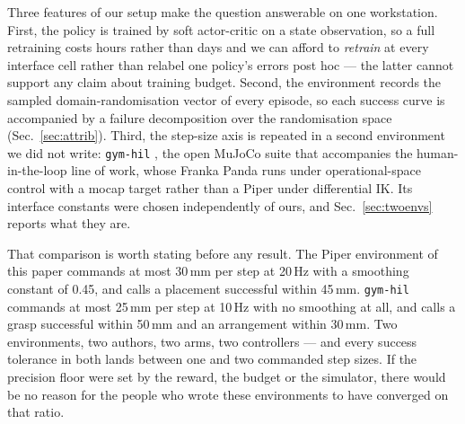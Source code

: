 \documentclass{article}
\begin{document}
Three features of our setup make the question answerable on one workstation.
First, the policy is trained by soft actor-critic \citep{haarnoja2018sac} on a
state observation, so a full retraining costs hours rather than days and we can
afford to \emph{retrain} at every interface cell rather than relabel one
policy's errors post hoc --- the latter cannot support any claim about training
budget. Second, the environment records the sampled domain-randomisation vector
of every episode, so each success curve is accompanied by a failure
decomposition over the randomisation space (Sec.~\ref{sec:attrib}). Third, the
step-size axis is repeated in a second environment we did not write:
\texttt{gym-hil} \citep{gymhil2025}, the open MuJoCo suite that accompanies the
human-in-the-loop line of work, whose Franka Panda runs under operational-space
control with a mocap target rather than a Piper under differential IK. Its
interface constants were chosen independently of ours, and
Sec.~\ref{sec:twoenvs} reports what they are.

That comparison is worth stating before any result. The Piper environment of
this paper commands at most 30\,mm per step at 20\,Hz with a smoothing constant
of 0.45, and calls a placement successful within 45\,mm. \texttt{gym-hil}
commands at most 25\,mm per step at 10\,Hz with no smoothing at all, and calls
a grasp successful within 50\,mm and an arrangement within 30\,mm. Two
environments, two authors, two arms, two controllers --- and every success
tolerance in both lands between one and two commanded step sizes. If the
precision floor were set by the reward, the budget or the simulator, there
would be no reason for the people who wrote these environments to have
converged on that ratio.
\end{document}
